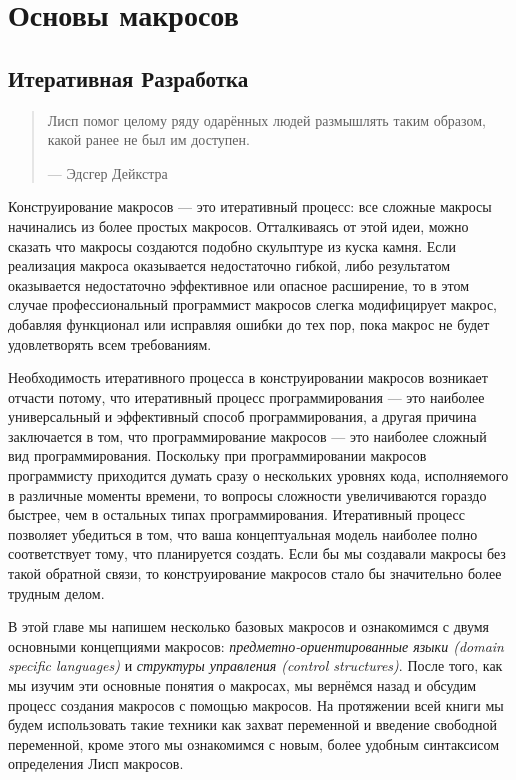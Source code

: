 \chapter{Основы макросов}\label{chapter_macro_basics}
\section{Итеративная Разработка}\label{section_iterative-development}
\begin{quote}
Лисп помог целому ряду одарённых людей размышлять таким образом, какой ранее не был им доступен.

--- Эдсгер Дейкстра
\end{quote}

Конструирование макросов --- это итеративный процесс: все сложные макросы начинались из более простых макросов. Отталкиваясь от этой идеи, можно сказать что макросы создаются подобно скульптуре из куска камня. Если реализация макроса оказывается недостаточно гибкой, либо результатом оказывается недостаточно эффективное или опасное расширение, то в этом случае профессиональный программист макросов слегка модифицирует макрос, добавляя функционал или исправляя ошибки до тех пор, пока макрос не будет удовлетворять всем требованиям.

Необходимость итеративного процесса в конструировании макросов возникает отчасти потому, что итеративный процесс программирования --- это наиболее универсальный и эффективный способ программирования, а другая причина заключается в том, что программирование макросов --- это наиболее сложный вид программирования. Поскольку при программировании макросов программисту приходится думать сразу о нескольких уровнях кода, исполняемого в различные моменты времени, то вопросы сложности увеличиваются гораздо быстрее, чем в остальных типах программирования. Итеративный процесс позволяет убедиться в том, что ваша концептуальная модель наиболее полно соответствует тому, что планируется создать. Если бы мы создавали макросы без такой обратной связи, то конструирование макросов стало бы значительно более трудным делом.

В этой главе мы напишем несколько базовых макросов и ознакомимся с двумя основными концепциями макросов: \emph{предметно-ориентированные языки (domain specific languages)} и \emph{структуры управления {(control structures)}}. После того, как мы изучим эти основные понятия о макросах, мы вернёмся назад и обсудим процесс создания макросов с помощью макросов. На протяжении всей книги мы будем использовать такие техники как захват переменной и введение свободной переменной, кроме этого мы ознакомимся с новым, более удобным синтаксисом определения Лисп макросов.

